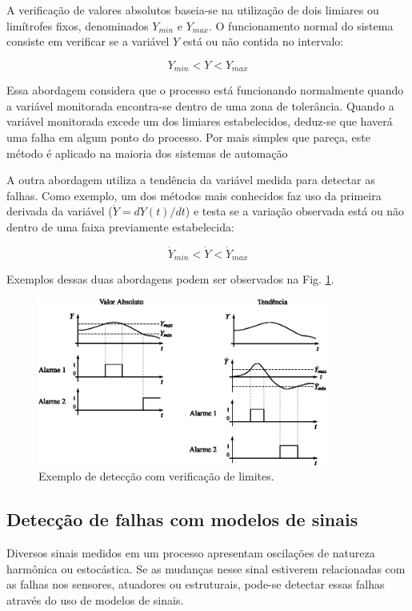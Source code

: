 A verificação de valores absolutos baseia-se na utilização de dois limiares ou
limítrofes fixos, denominados $Y_{min}$ e $Y_{max}$. O funcionamento normal do
sistema consiste em verificar se a variável $Y$ está ou não contida no
intervalo:

\begin{equation}
Y_{min} < Y < Y_{max}
\end{equation}

Essa abordagem considera que o processo está funcionando normalmente quando a
variável monitorada encontra-se dentro de uma zona de tolerância. Quando a
variável monitorada excede um dos limiares estabelecidos, deduz-se que haverá
uma falha em algum ponto do processo. Por mais simples que pareça, este método é
aplicado na maioria dos sistemas de automação

A outra abordagem utiliza a tendência da variável medida para detectar as
falhas. Como exemplo, um dos métodos mais conhecidos faz uso da primeira
derivada da variável ($\dot{Y} = dY(t)/dt$) e testa se a variação observada está
ou não dentro de uma faixa previamente estabelecida:

\begin{equation}
\dot{Y}_{min} < \dot{Y} < \dot{Y}_{max}
\end{equation}

Exemplos dessas duas abordagens podem ser observados na Fig.
\ref{fig:detec_ver_lim}.

\begin{figure}[htb]
\centering
    \includegraphics[width=0.85\textwidth]{imgs/detec_diag/eps/detec_ver_lim}
    \caption{Exemplo de detecção com verificação de limites.}
    \label{fig:detec_ver_lim}
\end{figure}

\subsection{Detecção de falhas com modelos de sinais}
Diversos sinais medidos em um processo apresentam oscilações de natureza
harmônica ou estocástica. Se as mudanças nesse sinal estiverem relacionadas com
as falhas nos sensores, atuadores ou estruturais, pode-se detectar essas falhas
através do uso de modelos de sinais.

